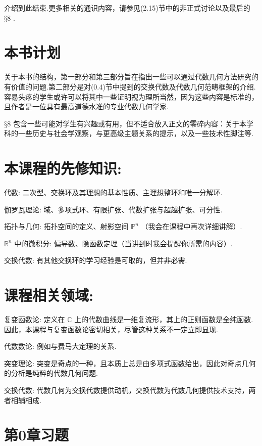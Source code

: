 介绍到此结束.更多相关的通识内容，请参见(2.15)节中的非正式讨论以及最后的 \(§8\) .

\section{本书计划}

关于本书的结构，第一部分和第三部分旨在指出一些可以通过代数几何方法研究的有价值的问题.第二部分是对(0.4)节中提到的交换代数及代数几何范畴框架的介绍.容易头疼的学生或许可以将其中一些证明视为理所当然，因为这些内容是标准的，且作者是一位具有最高道德水准的专业代数几何学家.

\(§8\) 包含一些可能对学生有兴趣或有用，但不适合放入正文的零碎内容：关于本学科的一些历史与社会学观察，与更高级主题关系的提示，以及一些技术性脚注等.

\section{本课程的先修知识:}

代数: 二次型、交换环及其理想的基本性质、主理想整环和唯一分解环.

伽罗瓦理论: 域、多项式环、有限扩张、代数扩张与超越扩张、可分性.

拓扑与几何: 拓扑空间的定义、射影空间 \({\mathbb{P}}^{n}\) （我会在课程中再次详细讲解）.

\({\mathbb{R}}^{n}\) 中的微积分: 偏导数、隐函数定理（当讲到时我会提醒你所需的内容）.

交换代数: 有其他交换环的学习经验是可取的，但并非必需.

\section{课程相关领域:}

复变函数论: 定义在 \(\mathbb{C}\) 上的代数曲线是一维复流形，其上的正则函数是全纯函数.因此，本课程与复变函数论密切相关，尽管这种关系不一定立即显现.

代数数论: 例如与费马大定理的关系.

突变理论: 突变是奇点的一种，且本质上总是由多项式函数给出，因此对奇点几何的分析是纯粹的代数几何问题.

交换代数: 代数几何为交换代数提供动机，交换代数为代数几何提供技术支持，两者相辅相成.

\section{第0章习题}


